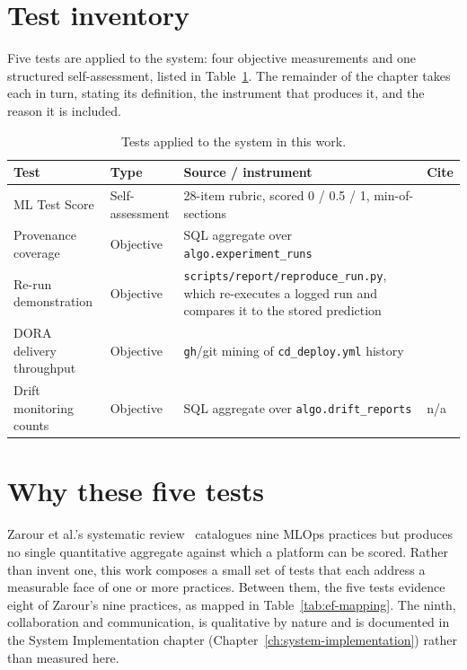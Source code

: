 \section{Test inventory}
\label{sec:ef-inventory}

Five tests are applied to the system: four objective measurements and one
structured self-assessment, listed in Table~\ref{tab:ef-inventory}. The
remainder of the chapter takes each in turn, stating its definition, the
instrument that produces it, and the reason it is included.

\begin{table}[h]
  \centering
  \caption{Tests applied to the system in this work.}
  \label{tab:ef-inventory}
  \begin{tabularx}{\linewidth}{@{}l l X l@{}}
    \toprule
    \textbf{Test} & \textbf{Type} & \textbf{Source / instrument} & \textbf{Cite} \\
    \midrule
    ML Test Score              & Self-assessment & 28-item rubric, scored 0 / 0.5 / 1, min-of-sections & \cite{breck2017mltestscore} \\
    Provenance coverage        & Objective       & SQL aggregate over \texttt{algo.experiment\_runs} & \cite{gundersen2018reproducibility} \\
    Re-run demonstration       & Objective       & \texttt{scripts/report/reproduce\_run.py}, which re-executes a logged run and compares it to the stored prediction & \cite{gundersen2018reproducibility} \\
    DORA delivery throughput   & Objective       & \texttt{gh}/git mining of \texttt{cd\_deploy.yml} history & \cite{forsgren2018accelerate} \\
    Drift monitoring counts    & Objective       & SQL aggregate over \texttt{algo.drift\_reports} & n/a \\
    \bottomrule
  \end{tabularx}
\end{table}

\section{Why these five tests}
\label{sec:ef-why}

Zarour et al.'s systematic review~\cite{zarour2025} catalogues nine MLOps
practices but produces no single quantitative aggregate against which a platform
can be scored. Rather than invent one, this work composes a small set of tests
that each address a measurable face of one or more practices. Between them, the
five tests evidence eight of Zarour's nine practices, as mapped in
Table~\ref{tab:ef-mapping}. The ninth, collaboration and communication, is
qualitative by nature and is documented in the System Implementation chapter
(Chapter~\ref{ch:system-implementation}) rather than measured here.

